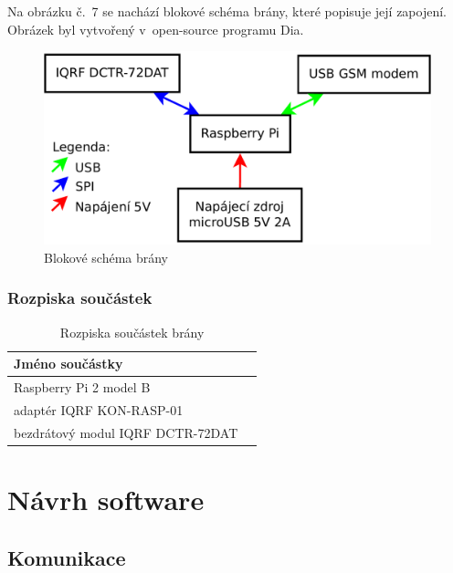 \documentclass[12pt,a4paper,oneside]{article}
\begin{document}
Na obrázku č.~7 se nachází blokové schéma brány, které popisuje její zapojení. Obrázek byl vytvořený v~open-source programu Dia\cite{sw/dia}.

\begin{figure}[H]
\centering
\label{fig:blokove-schema-zasuvky}
\includegraphics[width = 128mm]{../img/blokove-schema/brana.pdf}
\caption{Blokové schéma brány}
\end{figure}

\subsubsection{Rozpiska součástek}

\begin{table}[H]
  \centering
  \begin{tabular}{|l|l|}
    \hline
    \textbf{Jméno součástky} \\
    \hline
    \hline
    Raspberry Pi 2 model B \\
    \hline
    adaptér IQRF KON-RASP-01 \\
    \hline
    bezdrátový modul IQRF DCTR-72DAT \\
    \hline
  \end{tabular}
  \caption{Rozpiska součástek brány}\label{table:rozpiska-soucastek/brana}
\end{table}

\newpage

\section{Návrh software}

\subsection{Komunikace}
\end{document}
